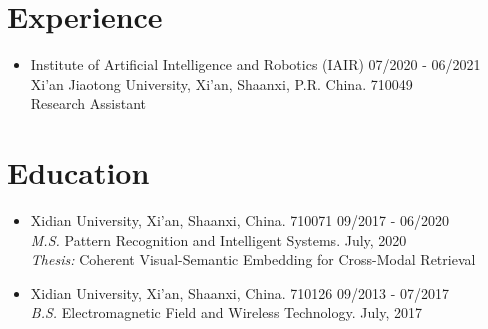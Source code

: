 \documentclass[margin,line,pifont,palatino,courier]{res}
\newenvironment{list1}{
  \begin{list}{\ding{113}}{%
      \setlength{\itemsep}{0in}
      \setlength{\parsep}{0in} \setlength{\parskip}{0in}
      \setlength{\topsep}{0in} \setlength{\partopsep}{0in}
      \setlength{\leftmargin}{0.17in}}}{\end{list}}
\newenvironment{list2}{
  \begin{list}{$\bullet$}{%
      \setlength{\itemsep}{0in}
      \setlength{\parsep}{0in} \setlength{\parskip}{0in}
      \setlength{\topsep}{0in} \setlength{\partopsep}{0in}
      \setlength{\leftmargin}{0.2in}}}{\end{list}}
\begin{document}
\begin{resume}
\section{\sc Experience}

\begin{itemize}[leftmargin=*]
	\item Institute of
		Artificial Intelligence and Robotics (IAIR) \hfill 07/2020 - 06/2021 \\
		Xi'an Jiaotong University, Xi'an, Shaanxi, P.R. China. 710049\\
		Research Assistant
\end{itemize}

\section{\sc Education}

\begin{itemize}[leftmargin=*]
\item Xidian University, Xi'an, Shaanxi, China. 710071 \hfill 09/2017 - 06/2020\\
	\textit{M.S.} Pattern Recognition and Intelligent Systems. July, 2020\\
	\textit{Thesis:} Coherent Visual-Semantic Embedding for Cross-Modal Retrieval
\item Xidian University, Xi'an, Shaanxi, China. 710126 \hfill 09/2013 - 07/2017\\
	\textit{B.S.} Electromagnetic Field and Wireless Technology. July, 2017
\end{itemize}

%
%
%


\end{resume}
\end{document}
